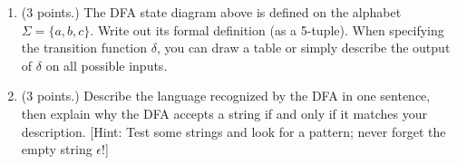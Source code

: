 \documentclass{../homework}
\begin{document}
\begin{enumerate}
    \item (3 points.) The DFA state diagram above is defined on the alphabet $\Sigma = \{a,b,c\}$. Write out its formal definition (as a 5-tuple). When specifying the transition function $\delta$, you can draw a table or simply describe the output of $\delta$ on all possible inputs. 
    
    \item (3 points.) Describe the language recognized by the DFA in one sentence, then explain why the DFA accepts a string if and only if it matches your description. [Hint: Test some strings and look for a pattern; never forget the empty string $\epsilon$!]
    
    \end{enumerate}
    
    
\clearpage
\end{document}
